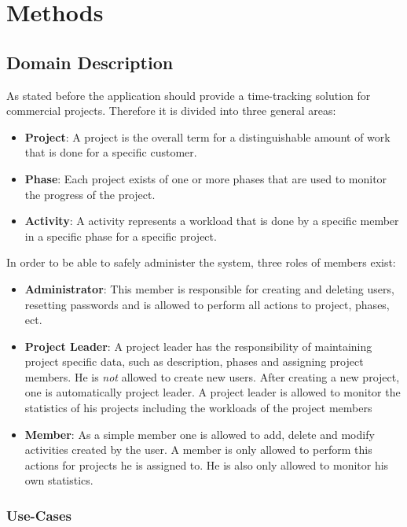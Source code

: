\chapter{Methods}

\section{Domain Description}
As stated before the application should provide a time-tracking solution for commercial projects.
Therefore it is divided into three general areas:
\begin{itemize}
\item \textbf{Project}: A project is the overall term for a distinguishable amount of work that is done for a specific customer.
\item \textbf{Phase}: Each project exists of one or more phases that are used to monitor the progress of the project.
\item \textbf{Activity}: A activity represents a workload that is done by a specific member in a specific phase for a specific project.
\end{itemize}
In order to be able to safely administer the system, three roles of members exist:
\begin{itemize}
\item \textbf{Administrator}: This member is responsible for creating and deleting users, resetting passwords and is allowed to perform all actions to project, phases, ect.
\item \textbf{Project Leader}: A project leader has the responsibility of maintaining project specific data, such as description, phases and assigning project members. He is \emph{not} allowed to create new users. After creating a new project, one is automatically project leader. A project leader is allowed to monitor the statistics of his projects including the workloads of the project members
\item \textbf{Member}: As a simple member one is allowed to add, delete and modify activities created by the user. A member is only allowed to perform this actions for projects he is assigned to. He is also only allowed to monitor his own statistics.
\end{itemize}

\subsection{Use-Cases}
